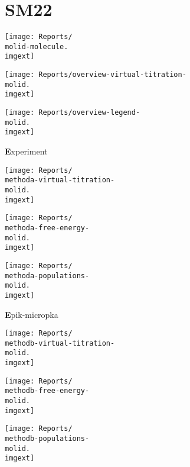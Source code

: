 \documentclass[9pt]{standalone}
\begin{document}
\newcommand{\molid}{SM22}
\newcommand{\imgext}{pdf}
\newcommand{\methoda}{Experiment}
\newcommand{\methodb}{Epik-micropka}
\newcommand{\methodc}{Jaguar-pKa}
\newcommand{\methodd}{Epik-free-energy}
\newcommand{\methode}{Epik-scan}
\section{\molid}
\noindent 
\begin{minipage}[s]{0.35\textwidth}\centering
\texttt{[image: Reports/\\molid-molecule.\\imgext]}
\end{minipage}
\begin{minipage}[s]{0.35\textwidth}
\texttt{[image: Reports/overview-virtual-titration-\\molid.\\imgext]}
\end{minipage}
\begin{minipage}[s]{0.23\textwidth}
\texttt{[image: Reports/overview-legend-\\molid.\\imgext]}
\end{minipage}

\begin{minipage}[s]{\textwidth}\centering
{\textbf \methoda}
\end{minipage}

\noindent
\begin{minipage}[s]{0.33\textwidth}\centering
\texttt{[image: Reports/\\methoda-virtual-titration-\\molid.\\imgext]}
\end{minipage}
\begin{minipage}[s]{0.33\textwidth}
\texttt{[image: Reports/\\methoda-free-energy-\\molid.\\imgext]}
\end{minipage}
\begin{minipage}[s]{0.33\textwidth}
\texttt{[image: Reports/\\methoda-populations-\\molid.\\imgext]}
\end{minipage}

\begin{minipage}[s]{\textwidth}\centering
{\textbf \methodb}
\end{minipage}

\noindent
\begin{minipage}[s]{0.33\textwidth}\centering
\texttt{[image: Reports/\\methodb-virtual-titration-\\molid.\\imgext]}
\end{minipage}
\begin{minipage}[s]{0.33\textwidth}
\texttt{[image: Reports/\\methodb-free-energy-\\molid.\\imgext]}
\end{minipage}
\begin{minipage}[s]{0.33\textwidth}
\texttt{[image: Reports/\\methodb-populations-\\molid.\\imgext]}
\end{minipage}
\end{document}
